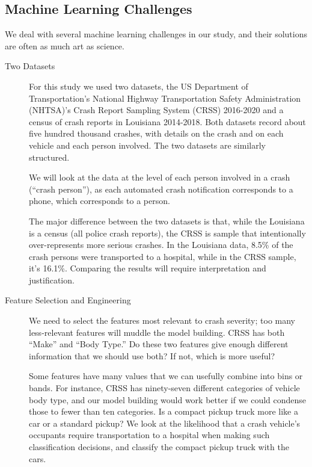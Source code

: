 \subsection{Machine Learning Challenges}

We deal with several machine learning challenges in our study, and their solutions are often as much art as science.  

\begin{description}

	\item [Two Datasets]  
	
For this study we used two datasets, the US Department of Transportation's  National Highway Transportation Safety Administration (NHTSA)'s Crash Report Sampling System (CRSS) 2016-2020 and a census of crash reports in Louisiana 2014-2018. \citep{CRSS}  Both datasets record about five hundred thousand crashes, with details on the crash and on each vehicle and each person involved.  The two datasets are similarly structured.  

We will look at the data at the level of each person involved in a crash (``crash person''), as each automated crash notification corresponds to a phone, which corresponds to a person.  	
	
The major difference between the two datasets is that, while the Louisiana is a census (all police crash reports), the CRSS is sample that intentionally over-represents more serious crashes.   In the Louisiana data, 8.5\% of the crash persons were transported to a hospital, while in the CRSS sample, it's 16.1\%.  
Comparing the results will require interpretation and justification.
	
	\item [Feature Selection and Engineering]  We need to select the features most relevant to crash severity; too many less-relevant features will muddle the model building.  CRSS has both ``Make'' and ``Body Type.''  Do these two features give enough different information that we should use both?  If not, which is more useful?
	
Some features have many values that we can usefully combine into bins or bands.  For instance, CRSS has ninety-seven different categories of vehicle body type, and our model building would work better if we could condense those to fewer than ten categories.  Is a compact pickup truck more like a car or a standard pickup?  We look at the likelihood that a crash vehicle's occupants require transportation to a hospital when making such classification decisions, and classify the compact pickup truck with the cars.  


\end{description}

